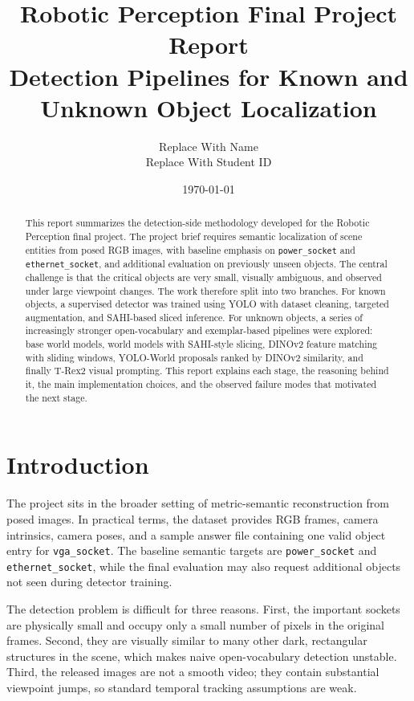 \documentclass[11pt,a4paper]{article}
\title{\textbf{Robotic Perception Final Project Report}\\Detection Pipelines for Known and Unknown Object Localization}
\author{%
  Replace With Name \\
  Replace With Student ID
}
\date{\today}
\begin{document}
\maketitle
\onehalfspacing

\begin{abstract}
This report summarizes the detection-side methodology developed for the Robotic Perception final project. The project brief requires semantic localization of scene entities from posed RGB images, with baseline emphasis on \texttt{power\_socket} and \texttt{ethernet\_socket}, and additional evaluation on previously unseen objects. The central challenge is that the critical objects are very small, visually ambiguous, and observed under large viewpoint changes. The work therefore split into two branches. For known objects, a supervised detector was trained using YOLO with dataset cleaning, targeted augmentation, and SAHI-based sliced inference. For unknown objects, a series of increasingly stronger open-vocabulary and exemplar-based pipelines were explored: base world models, world models with SAHI-style slicing, DINOv2 feature matching with sliding windows, YOLO-World proposals ranked by DINOv2 similarity, and finally T-Rex2 visual prompting. This report explains each stage, the reasoning behind it, the main implementation choices, and the observed failure modes that motivated the next stage.
\end{abstract}

\section{Introduction}

The project sits in the broader setting of metric-semantic reconstruction from posed images. In practical terms, the dataset provides RGB frames, camera intrinsics, camera poses, and a sample answer file containing one valid object entry for \texttt{vga\_socket}. The baseline semantic targets are \texttt{power\_socket} and \texttt{ethernet\_socket}, while the final evaluation may also request additional objects not seen during detector training.

The detection problem is difficult for three reasons. First, the important sockets are physically small and occupy only a small number of pixels in the original frames. Second, they are visually similar to many other dark, rectangular structures in the scene, which makes naive open-vocabulary detection unstable. Third, the released images are not a smooth video; they contain substantial viewpoint jumps, so standard temporal tracking assumptions are weak.
\end{document}

